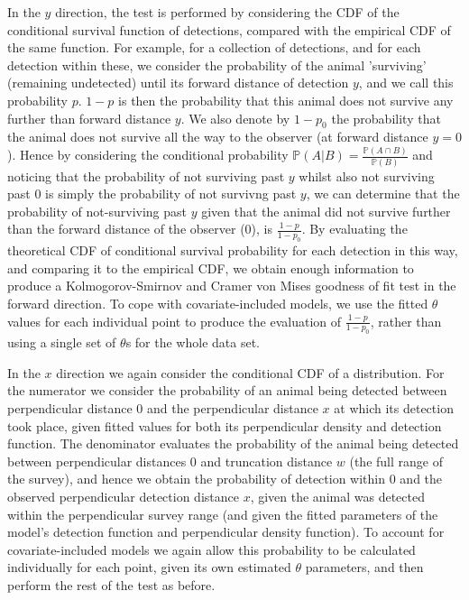 \documentclass[11pt]{article}
\begin{document}
\begin{multicols}{2}
In the $y$ direction, the test is performed by considering the CDF of the conditional survival function of detections, compared with the empirical CDF of the same function. For example, for a collection of detections, and for each detection within these, we consider the probability of the animal 'surviving' (remaining undetected) until its forward distance of detection $y$, and we call this probability $p$. $1-p$ is then the probability that this animal does not survive any further than forward distance $y$. We also denote by $1-p_0$ the probability that the animal does not survive all the way to the observer (at forward distance $y=0$). Hence by          considering the conditional probability $\mathbb{P}\left(A|B\right) = \frac{\mathbb{P}\left(A\cap B\right)}{\mathbb{P}\left(B\right)}$ and noticing that the probability of not surviving past $y$ whilst also not surviving past $0$ is simply the probability of not survivng past $y$, we can determine that the probability of not-surviving past $y$ given that the animal did not survive further than the forward distance of the observer ($0$), is $\frac{1-p}{1-p_0}$. By evaluating the theoretical CDF of conditional survival probability for each detection in this way, and comparing it to the empirical CDF, we obtain enough information to produce a Kolmogorov-Smirnov and Cramer von Mises goodness of fit test in the forward direction. To cope with covariate-included models, we use the fitted $\theta$ values for each individual point to produce the evaluation of $\frac{1-p}{1-p_0}$, rather than using a single set of $\theta$s for the whole data set. 

In the $x$ direction we again consider the conditional CDF of a distribution. For the numerator we consider the probability of an animal being detected between perpendicular distance $0$ and the perpendicular distance $x$ at which its detection took place, given fitted values for both its perpendicular density and detection function. The denominator evaluates the probability of the animal being detected between perpendicular distances $0$ and truncation distance $w$ (the full range of the survey), and hence we obtain the probability of detection within $0$ and the observed perpendicular detection distance $x$, given the animal was detected within the perpendicular survey range (and given the fitted parameters of the model's detection function and perpendicular density function). To account for covariate-included models we again allow this probability to be calculated individually for each point, given its own estimated $\theta$ parameters, and then perform the rest of the test as before. 


\end{multicols}
\end{document}
